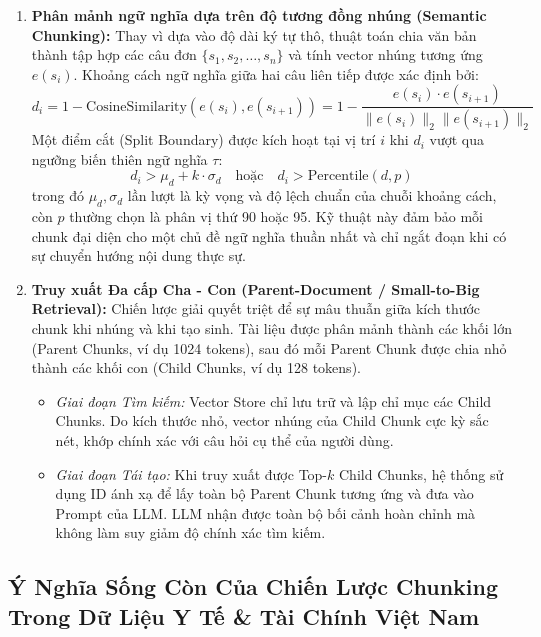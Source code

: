 \documentclass[12pt,a4paper]{report}
\begin{document}
\begin{enumerate}[itemsep=2pt, parsep=0pt, topsep=3pt]
    \item \textbf{Phân mảnh ngữ nghĩa dựa trên độ tương đồng nhúng (Semantic Chunking):}
    Thay vì dựa vào độ dài ký tự thô, thuật toán chia văn bản thành tập hợp các câu đơn $\{s_1, s_2, \dots, s_n\}$ và tính vector nhúng tương ứng $e(s_i)$. Khoảng cách ngữ nghĩa giữa hai câu liên tiếp được xác định bởi:
    \begin{equation}
        d_i = 1 - \text{CosineSimilarity}(e(s_i), e(s_{i+1})) = 1 - \frac{e(s_i) \cdot e(s_{i+1})}{\|e(s_i)\|_2 \|e(s_{i+1})\|_2}
    \end{equation}
    Một điểm cắt (Split Boundary) được kích hoạt tại vị trí $i$ khi $d_i$ vượt qua ngưỡng biến thiên ngữ nghĩa $\tau$:
    \begin{equation}
        d_i > \mu_d + k \cdot \sigma_d \quad \text{hoặc} \quad d_i > \text{Percentile}(d, p)
    \end{equation}
    trong đó $\mu_d, \sigma_d$ lần lượt là kỳ vọng và độ lệch chuẩn của chuỗi khoảng cách, còn $p$ thường chọn là phân vị thứ 90 hoặc 95. Kỹ thuật này đảm bảo mỗi chunk đại diện cho một chủ đề ngữ nghĩa thuần nhất và chỉ ngắt đoạn khi có sự chuyển hướng nội dung thực sự.

    \item \textbf{Truy xuất Đa cấp Cha - Con (Parent-Document / Small-to-Big Retrieval):}
    Chiến lược giải quyết triệt để sự mâu thuẫn giữa kích thước chunk khi nhúng và khi tạo sinh. Tài liệu được phân mảnh thành các khối lớn (Parent Chunks, ví dụ 1024 tokens), sau đó mỗi Parent Chunk được chia nhỏ thành các khối con (Child Chunks, ví dụ 128 tokens).
    \begin{itemize}[itemsep=1pt, parsep=0pt, topsep=2pt]
        \item \textit{Giai đoạn Tìm kiếm:} Vector Store chỉ lưu trữ và lập chỉ mục các Child Chunks. Do kích thước nhỏ, vector nhúng của Child Chunk cực kỳ sắc nét, khớp chính xác với câu hỏi cụ thể của người dùng.
        \item \textit{Giai đoạn Tái tạo:} Khi truy xuất được Top-$k$ Child Chunks, hệ thống sử dụng ID ánh xạ để lấy toàn bộ Parent Chunk tương ứng và đưa vào Prompt của LLM. LLM nhận được toàn bộ bối cảnh hoàn chỉnh mà không làm suy giảm độ chính xác tìm kiếm.
    \end{itemize}
\end{enumerate}

\subsection{Ý Nghĩa Sống Còn Của Chiến Lược Chunking Trong Dữ Liệu Y Tế \& Tài Chính Việt Nam}
\end{document}
